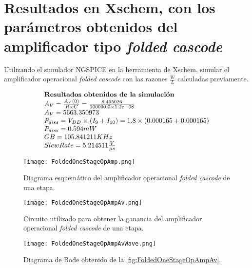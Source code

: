 \section{Resultados en Xschem, con los parámetros obtenidos del amplificador tipo \textit{folded cascode} \label{sec:s4}}

\begin{center}
	\begin{minipage}{12cm}
		\begin{tcolorbox}[title=Actividad 2]
			Utilizando el simulador NGSPICE en la herramienta de Xschem, simular el amplificador operacional \textit{folded cascode} con las razones $\frac{W}{L}$ calculadas previamente.
		\end{tcolorbox}	
	\end{minipage}
\end{center}

\begin{equation*}
	\begin{array}{l l}
		\textbf{Resultados obtenidos de la simulación} \\
		A_{V} = \frac{A_{V}(0)}{R \times C} = \frac{ 8.495026 }{ 100000.0 \times 1.2e-08 } \\
		A_{V} =  5663.350973  \\
		P_{diss} = V_{DD} \times (I_{9}+I_{10}) =  1.8 \times ( 0.000165  +  0.000165 ) \\
		P_{diss} =  0.594  mW \\
		GB =  105.841211  KHz \\
		Slew Rate =  5.214511 \frac{V}{\mu s} \\
	\end{array}
\end{equation*}

\begin{figure}[ht]
	\centering
	\texttt{[image: FoldedOneStageOpAmp.png]}
	\caption{Diagrama esquemático del amplificador operacional \textit{folded cascode} de una etapa. \label{fig:FoldedOneStageOpAmp}}
\end{figure}

\begin{figure}[ht]
	\centering
	\texttt{[image: FoldedOneStageOpAmpAv.png]}
	\caption{Circuito utilizado para obtener la ganancia del amplificador operacional \textit{folded cascode} de una etapa. \label{fig:FoldedOneStageOpAmpAv}}
\end{figure}

\begin{figure}[ht]
	\centering
	\texttt{[image: FoldedOneStageOpAmpAvWave.png]}
	\caption{Diagrama de Bode obtenido de la \autoref{fig:FoldedOneStageOpAmpAv}. \label{fig:FoldedOneStageOpAmpAvWF}}
\end{figure}

